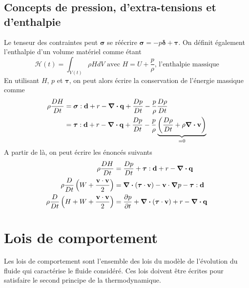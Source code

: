 \documentclass[a4paper,11pt]{report}
\newcommand{\bs}[1]{\boldsymbol{#1}}
\newcommand{\dvm}[2]{\frac{D #1}{D #2}}
\begin{document}
    \subsection{Concepts de pression, d'extra-tensions et d'enthalpie}
      Le tenseur des contraintes peut $\bs{\sigma}$ se réécrire $\bs{\sigma} = -p \bs{\delta} + \bs{\tau}$. On définit également l'enthalpie d'un volume matériel comme étant
      \begin{equation}
        \mathcal{H}(t) = \int_{V(t)} \rho H dV \textrm{ avec } H = U + \frac{p}{\rho}\textrm{, l'enthalpie massique}
      \end{equation}
      En utilisant $H$, $p$ et $\bs{\tau}$, on peut alors écrire la conservation de l'énergie massique comme
      \begin{align}
        \rho \dvm{H}{t} &= \bs{\sigma} : \vb{d} + r - \div \vb{q} +  \dvm{p}{t} - \frac{p}{\rho}\dvm{\rho}{t}\nonumber\\
        &= \bs{\tau} : \vb{d} + r - \div \vb{q} + \dvm{p}{t} - \frac{p}{\rho} \underbrace{\left(\dvm{\rho}{t} + \rho \div \vb{v} \right)}_{=0}
      \end{align}
      A partir de là, on peut écrire les énoncés suivants
      \begin{equation}\begin{aligned}
        \rho \dvm{H}{t} &= \dvm{p}{t} + \bs{\tau} : \vb{d} + r - \div \vb{q}\\
        \rho \dvm{}{t}\left(W + \frac{\vb{v}\cdot\vb{v}}{2}\right) &= \div (\bs{\tau} \cdot \vb{v}) - \vb{v} \cdot \grad p - \bs{\tau} : \vb{d} \\
        \rho \dvm{}{t}\left(H + W + \frac{\vb{v}\cdot\vb{v}}{2}\right) &= \pdv{p}{t} + \div (\bs{\tau} \cdot \vb{v}) + r - \div \vb{q}
      \end{aligned}\end{equation}

  \section{Lois de comportement}
    Les lois de comportement sont l'ensemble des lois du modèle de l'évolution du fluide qui caractérise le fluide considéré. Ces lois doivent être écrites pour satisfaire le second principe de la thermodynamique.
\end{document}
